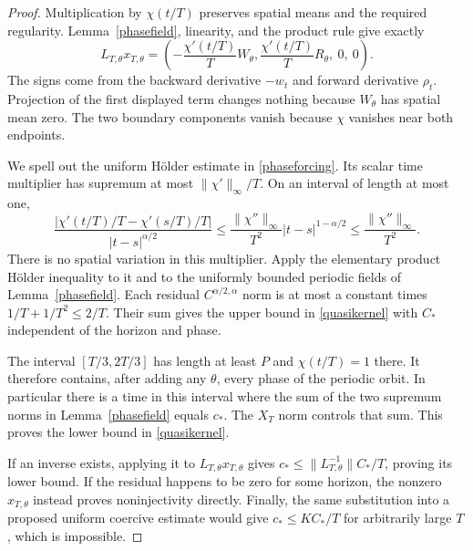 \documentclass[11pt]{article}
\begin{document}
\begin{proof}
Multiplication by $\chi(t/T)$ preserves spatial means and the required
regularity. Lemma~\ref{phasefield}, linearity, and the product rule give
exactly
\begin{equation}\label{phaseforcing}
 L_{T,\theta}x_{T,\theta}
 =\left(-\frac{\chi'(t/T)}T W_\theta,
          \frac{\chi'(t/T)}T R_\theta,\ 0,\ 0\right).
\end{equation}
The signs come from the backward derivative $-w_t$ and forward
derivative $\rho_t$. Projection of the first displayed term changes
nothing because $W_\theta$ has spatial mean zero. The two boundary
components vanish because $\chi$ vanishes near both endpoints.

We spell out the uniform H\"older estimate in \eqref{phaseforcing}.
Its scalar time multiplier has supremum at most $\|\chi'\|_\infty/T$.
On an interval of length at most one,
\[
 \frac{|\chi'(t/T)/T-\chi'(s/T)/T|}{|t-s|^{\alpha/2}}
 \leq\frac{\|\chi''\|_\infty}{T^2}|t-s|^{1-\alpha/2}
 \leq\frac{\|\chi''\|_\infty}{T^2}.
\]
There is no spatial variation in this multiplier. Apply the elementary
product H\"older inequality to it and to the uniformly bounded periodic
fields of Lemma~\ref{phasefield}. Each residual $C^{\alpha/2,\alpha}$
norm is at most a constant times $1/T+1/T^2\leq2/T$.
Their sum gives the upper bound in \eqref{quasikernel} with $C_*$
independent of the horizon and phase.

The interval $[T/3,2T/3]$ has length at least $P$ and $\chi(t/T)=1$
there. It therefore contains, after adding any $\theta$, every phase
of the periodic orbit. In particular there is a time in this interval
where the sum of the two supremum norms in Lemma~\ref{phasefield}
equals $c_*$. The $X_T$ norm controls that sum. This proves the lower
bound in \eqref{quasikernel}.

If an inverse exists, applying it to
$L_{T,\theta}x_{T,\theta}$ gives
$c_*\leq\|L_{T,\theta}^{-1}\|C_*/T$, proving its lower bound.
If the residual happens to be zero for some horizon, the nonzero
$x_{T,\theta}$ instead proves noninjectivity directly. Finally, the
same substitution into a proposed uniform coercive estimate would give
$c_*\leq KC_*/T$ for arbitrarily large $T$, which is impossible.
\end{proof}
\end{document}
